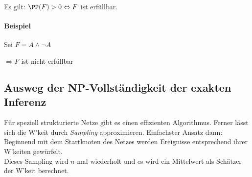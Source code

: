 \begin{center}
{
}
\end{center}
Es gilt: $\PP(F) > 0 \Leftrightarrow F $ ist erfüllbar.
\paragraph{Beispiel} Sei $F=A \wedge \neg A$
\begin{center}
\end{center}
$\Rightarrow F$ ist nicht erfüllbar
\subsection{Ausweg der NP-Vollständigkeit der exakten Inferenz}
Für speziell strukturierte Netze gibt es einen effizienten Algorithmus. Ferner lässt sich die W'keit durch \emph{Sampling} approximieren. Einfachster Ansatz dann: Beginnend mit dem Startknoten des Netzes werden Ereignisse entsprechend ihrer W'keiten gewürfelt.\\
Dieses Sampling wird $n$-mal wiederholt und es wird ein Mittelwert als Schätzer der W'keit berechnet.
